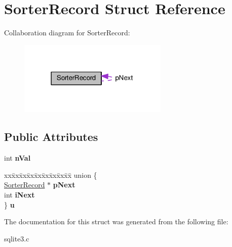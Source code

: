 \hypertarget{structSorterRecord}{}\section{Sorter\+Record Struct Reference}
\label{structSorterRecord}


Collaboration diagram for Sorter\+Record\+:\nopagebreak
\begin{figure}[H]
\begin{center}
\leavevmode
\includegraphics[width=202pt]{structSorterRecord__coll__graph}
\end{center}
\end{figure}
\subsection*{Public Attributes}
\begin{DoxyCompactItemize}
\item 
int {\bfseries n\+Val}\hypertarget{structSorterRecord_a2b8ffc0f8410826de8b41425759bf462}{}\label{structSorterRecord_a2b8ffc0f8410826de8b41425759bf462}

\item 
\begin{tabbing}
xx\=xx\=xx\=xx\=xx\=xx\=xx\=xx\=xx\=\kill
union \{\\
\>\hyperlink{structSorterRecord}{SorterRecord} $\ast$ {\bfseries pNext}\\
\>int {\bfseries iNext}\\
\} {\bfseries u}\hypertarget{structSorterRecord_a95d438d535a97eb4ed5f57d2677aaa6b}{}\label{structSorterRecord_a95d438d535a97eb4ed5f57d2677aaa6b}
\\

\end{tabbing}\end{DoxyCompactItemize}


The documentation for this struct was generated from the following file\+:\begin{DoxyCompactItemize}
\item 
sqlite3.\+c\end{DoxyCompactItemize}

